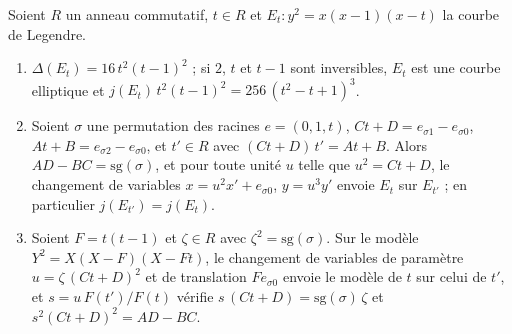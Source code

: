 \begin{encadre}
\begin{enonce}
Soient $R$ un anneau commutatif, $t \in R$ et $E_t : y^2 = x(x - 1)(x - t)$ la courbe de Legendre.
\begin{enumerate}
\item $\Delta(E_t) = 16\,t^2(t - 1)^2$ ; si $2$, $t$ et $t - 1$ sont inversibles, $E_t$ est une courbe elliptique et $j(E_t)\,t^2(t - 1)^2 = 256\,(t^2 - t + 1)^3$.
\item Soient $\sigma$ une permutation des racines $e = (0, 1, t)$, $Ct + D = e_{\sigma 1} - e_{\sigma 0}$, $At + B = e_{\sigma 2} - e_{\sigma 0}$, et $t' \in R$ avec $(Ct + D)\,t' = At + B$. Alors $AD - BC = \mathrm{sg}(\sigma)$, et pour toute unité $u$ telle que $u^2 = Ct + D$, le changement de variables $x = u^2 x' + e_{\sigma 0}$, $y = u^3 y'$ envoie $E_t$ sur $E_{t'}$ ; en particulier $j(E_{t'}) = j(E_t)$.
\item Soient $F = t(t - 1)$ et $\zeta \in R$ avec $\zeta^2 = \mathrm{sg}(\sigma)$. Sur le modèle $Y^2 = X(X - F)(X - Ft)$, le changement de variables de paramètre $u = \zeta\,(Ct + D)^2$ et de translation $F e_{\sigma 0}$ envoie le modèle de $t$ sur celui de $t'$, et $s = u\,F(t')/F(t)$ vérifie $s\,(Ct + D) = \mathrm{sg}(\sigma)\,\zeta$ et $s^2 (Ct + D)^2 = AD - BC$.
\end{enumerate}
\end{enonce}
\end{encadre}
